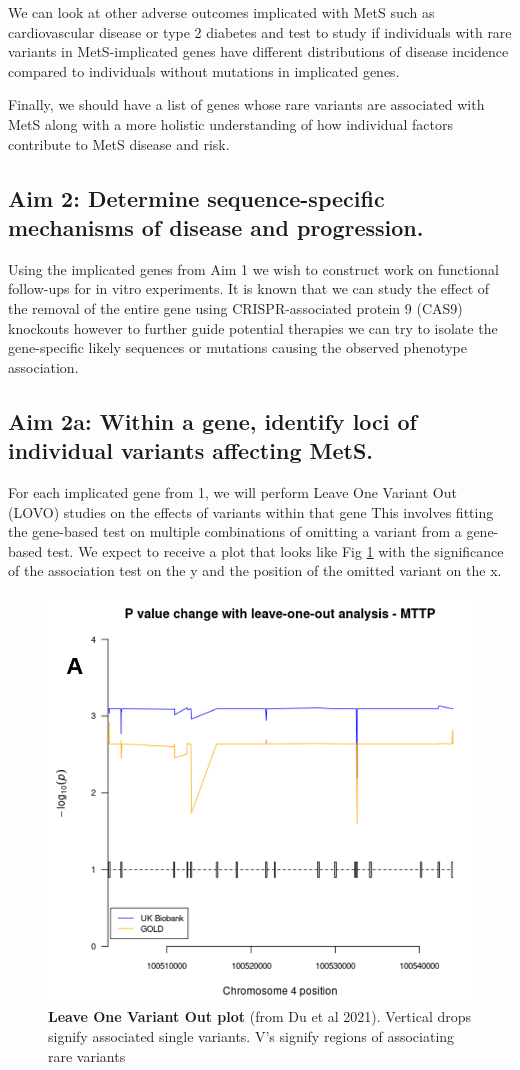 \documentclass[11pt]{article}
\begin{document}
We can look at other adverse outcomes implicated with MetS such as cardiovascular disease or type 2 diabetes and test to study if individuals with rare variants in MetS-implicated genes have different distributions of disease incidence compared to individuals without mutations in implicated genes. 

Finally, we should have a list of genes whose rare variants are associated with MetS along with a more holistic understanding of how individual factors contribute to MetS disease and risk.

\subsection*{Aim 2: Determine sequence-specific mechanisms of disease and progression.}

Using the implicated genes from Aim 1 we wish to construct work on functional follow-ups for in vitro experiments. It is known that we can study the effect of the removal of the entire gene using CRISPR-associated protein 9 (CAS9) knockouts however to further guide potential therapies we can try to isolate the gene-specific likely sequences or mutations causing the observed phenotype association.

\subsection*{Aim 2a: Within a gene, identify loci of individual variants affecting MetS.} 

For each implicated gene from 1, we will perform Leave One Variant Out (LOVO) studies on the effects of variants within that gene This involves fitting the gene-based test on multiple combinations of omitting a variant from a gene-based test. We expect to receive a plot that looks like Fig \ref{fig:f2} with the significance of the association test on the y and the position of the omitted variant on the x.

\begin{figure}[h]
  \includegraphics[width=0.7\linewidth]{"images/fig2.png"} 
  \caption{\textbf{Leave One Variant Out plot} (from Du et al 2021). Vertical drops signify associated single variants. V's signify regions of associating rare variants}
  \label{fig:f2}
\end{figure}
  
\end{document}
